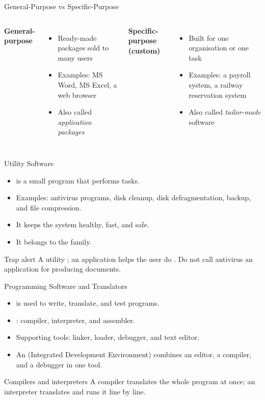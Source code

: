 \documentclass[aspectratio=169]{beamer}
\begin{document}
\begin{frame}{General-Purpose vs Specific-Purpose}
  \begin{columns}[T]
      \textbf{General-purpose}
      \begin{itemize}
        \item Ready-made packages sold to many users
        \item Examples: MS Word, MS Excel, a web browser
        \item Also called \emph{application packages}
      \end{itemize}
      \textbf{Specific-purpose (custom)}
      \begin{itemize}
        \item Built for one organisation or one task
        \item Examples: a payroll system, a railway reservation system
        \item Also called \emph{tailor-made} software
      \end{itemize}
  \end{columns}
\end{frame}

\begin{frame}{Utility Software}
  \begin{itemize}
    \item {} is a small program that performs
       tasks.
    \item Examples: antivirus programs, disk cleanup, disk defragmentation,
      backup, and file compression.
    \item It keeps the system healthy, fast, and safe.
    \item It belongs to the  family.
  \end{itemize}
  \begin{alertblock}{Trap alert}
    A utility ; an application helps the user do
    . Do not call antivirus an application for producing documents.
  \end{alertblock}
\end{frame}

\begin{frame}{Programming Software and Translators}
  \begin{itemize}
    \item {} is used to write, translate, and test
      programs.
    \item {}: compiler, interpreter, and assembler.
    \item Supporting tools: linker, loader, debugger, and text editor.
    \item An  (Integrated Development Environment) combines an
      editor, a compiler, and a debugger in one tool.
  \end{itemize}
  \begin{block}{Compilers and interpreters}
    A compiler translates the whole program at once; an interpreter
    translates and runs it line by line.
  \end{block}
\end{frame}
\end{document}
